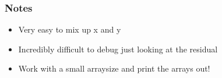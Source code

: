 \begin{frame}
  \frametitle{Notes}
  \begin{itemize}
  \item Very easy to mix up x and y
  \item Incredibly difficult to debug just looking at the residual
  \item Work with a small arraysize and print the arrays out!
  \end{itemize}
\end{frame}
